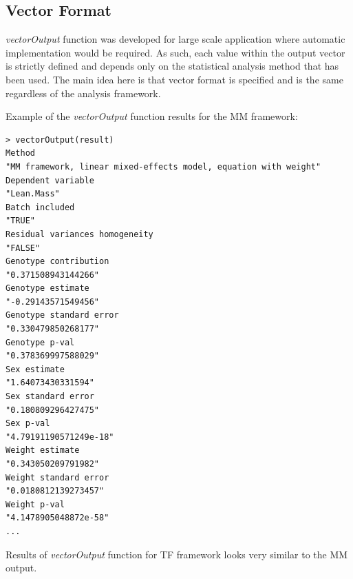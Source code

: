 \documentclass[12pt,a4paper]{article}
\begin{document}
\subsection{Vector Format}
\label{section:vectorOutput}
\textit{vectorOutput} function was developed for large scale application where automatic implementation would be required. 
As such, each value within the output vector is strictly defined and depends only on the statistical analysis method that has been used. 
The main idea here is that vector format is specified and is the same regardless of the analysis framework.

Example of the \textit{vectorOutput} function results for the MM framework:
\begingroup
\fontsize{8pt}{12pt}\selectfont
\begin{verbatim}
> vectorOutput(result)
Method 
"MM framework, linear mixed-effects model, equation with weight" 
Dependent variable 
"Lean.Mass" 
Batch included 
"TRUE" 
Residual variances homogeneity 
"FALSE" 
Genotype contribution 
"0.371508943144266" 
Genotype estimate 
"-0.29143571549456" 
Genotype standard error 
"0.330479850268177" 
Genotype p-val 
"0.378369997588029" 
Sex estimate 
"1.64073430331594" 
Sex standard error 
"0.180809296427475" 
Sex p-val 
"4.79191190571249e-18" 
Weight estimate 
"0.343050209791982" 
Weight standard error 
"0.0180812139273457" 
Weight p-val 
"4.1478905048872e-58" 
...
\end{verbatim}
\endgroup

Results of \textit{vectorOutput} function for TF framework looks very similar to the MM output.
\end{document}
